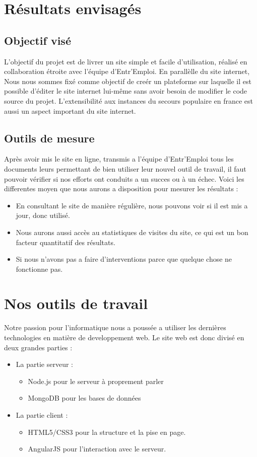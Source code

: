 \documentclass[a4paper, 12pt]{report}
\begin{document}
\chapter{Résultats envisagés}
\thispagestyle{fancy}

\section{Objectif visé}
L'objectif du projet est de livrer un site simple et facile d'utilisation, réalisé en collaboration étroite avec l'équipe d'Entr'Emploi.
En parallèlle du site internet, Nous nous sommes fixé comme objectif de creér un plateforme sur laquelle il est possible d'éditer
le site internet lui-même sans avoir besoin de modifier le code source du projet. L'extensibilité aux instances du secours populaire en france
est aussi un aspect important du site internet.

\section{Outils de mesure}
Après avoir mis le site en ligne, transmis a l'équipe d'Entr'Emploi tous les documents leurs permettant de bien utiliser leur nouvel outil de travail, il faut pouvoir vérifier si nos efforts
ont conduits a un succes ou à un échec. Voici les differentes moyen que nous aurons a disposition pour mesurer les résultats :
\begin{itemize}
    \item En consultant le site de manière régulière, nous pouvons voir si il est mis a jour, donc utilisé.
    \item Nous aurons aussi accès au statistiques de visites du site, ce qui est un bon facteur quantitatif des résultats.
    \item Si nous n'avons pas a faire d'interventions parce que quelque chose ne fonctionne pas.
\end{itemize}

\chapter{Nos outils de travail}

Notre passion pour l'informatique nous a poussée a utiliser les dernières technologies en matière de developpement
web.
Le site web est donc divisé en deux grandes parties :
\begin{itemize}
    \item La partie serveur :
    \begin{itemize}
        \item Node.js pour le serveur à proprement parler
        \item MongoDB pour les bases de données
    \end{itemize}
    \item La partie client :
    \begin{itemize}
        \item HTML5/CSS3 pour la structure et la pise en page.
        \item AngularJS pour l'interaction avec le serveur.
    \end{itemize}
\end{itemize}
\end{document}
